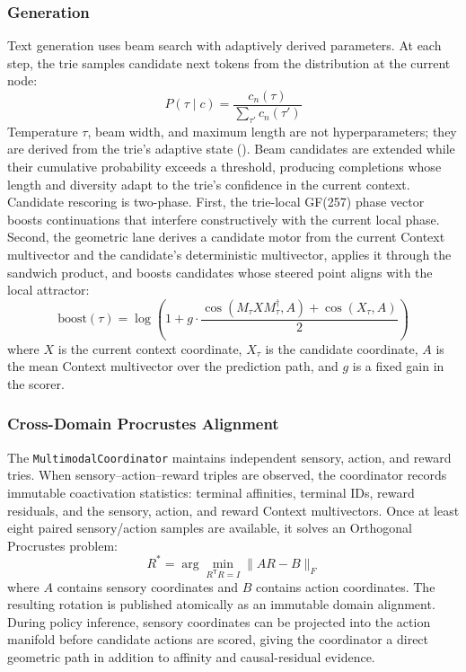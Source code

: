\subsubsection{Generation}

Text generation uses beam search with adaptively derived parameters.
At each step, the trie samples candidate next tokens from the
distribution at the current node:
\begin{equation}
  P(\tau \mid c) = \frac{c_n(\tau)}{\sum_{\tau'} c_n(\tau')}
  \label{eq:generation}
\end{equation}
Temperature $\tau$, beam width, and maximum length are not
hyperparameters; they are derived from the trie's adaptive state
().  Beam candidates are extended while
their cumulative probability exceeds a threshold, producing
completions whose length and diversity adapt to the trie's confidence
in the current context.  Candidate rescoring is two-phase.  First, the
trie-local GF(257) phase vector boosts continuations that interfere
constructively with the current local phase.  Second, the geometric lane
derives a candidate motor from the current Context multivector and the
candidate's deterministic multivector, applies it through the sandwich
product, and boosts candidates whose steered point aligns with the local
attractor:
\begin{equation}
  \text{boost}(\tau)
    = \log\!\left(1 + g \cdot
      \frac{\cos(M_{\tau} X M_{\tau}^{\dagger}, A) +
            \cos(X_{\tau}, A)}{2}\right)
  \label{eq:geometric_continuation_boost}
\end{equation}
where $X$ is the current context coordinate, $X_{\tau}$ is the candidate
coordinate, $A$ is the mean Context multivector over the prediction
path, and $g$ is a fixed gain in the scorer.

\subsubsection{Cross-Domain Procrustes Alignment}

The \texttt{MultimodalCoordinator} maintains independent sensory,
action, and reward tries.  When sensory--action--reward triples are
observed, the coordinator records immutable coactivation statistics:
terminal affinities, terminal IDs, reward residuals, and the sensory,
action, and reward Context multivectors.  Once at least eight paired
sensory/action samples are available, it solves an Orthogonal Procrustes
problem:
\begin{equation}
  R^* = \arg\min_{R^\mathsf{T}R = I} \lVert AR - B \rVert_F
  \label{eq:domain_procrustes}
\end{equation}
where $A$ contains sensory coordinates and $B$ contains action
coordinates.  The resulting rotation is published atomically as an
immutable domain alignment.  During policy inference, sensory
coordinates can be projected into the action manifold before candidate
actions are scored, giving the coordinator a direct geometric path in
addition to affinity and causal-residual evidence.

